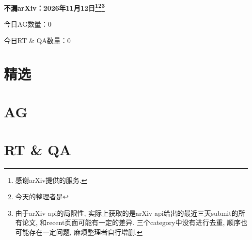 \documentclass[9pt, a4paper]{article}
\theoremstyle{plain}
\theoremstyle{definition}
\theoremstyle{remark}
\newcommand{\AGnumber}{0}
\newcommand{\RTQAnumber}{0}
\newcommand{\NewestDate}{2026年11月12日}
\newcommand{\todayarXiver}{} %
\begin{document}
\begin{center}
    \Huge\textbf{不漏arXiv：\NewestDate\footnote{感谢arXiv提供的服务.}\footnote{今天的整理者是\todayarXiver}\footnote{由于arXiv api的局限性, 实际上获取的是arXiv api给出的最近三天submit的所有论文, 和recent页面可能有一定的差异. 三个category中没有进行去重, 顺序也可能存在一定问题, 麻烦整理者自行增删.}} \\
\end{center}

\setcounter{section}{-1}

\begin{center}
    今日AG数量：\AGnumber
    
    今日RT \& QA数量：\RTQAnumber
    
\end{center}


\section{精选}


\section{AG}

\section{RT \& QA}
\end{document}
